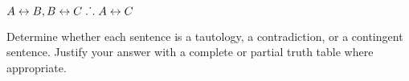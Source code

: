 \begin{earg}
\item $A\leftrightarrow B, B\leftrightarrow C \mathrel{\ldotp\dot{}\,\ldotp} A\leftrightarrow C$ %
\end{earg}

\problempart
\label{pr.TT.TTorC3}
Determine whether each sentence is a tautology, a contradiction, or a contingent sentence. Justify your answer with a complete or partial truth table where appropriate.


